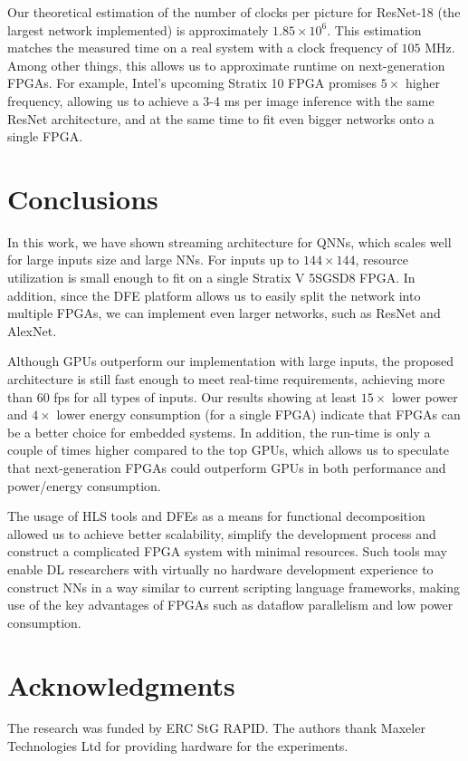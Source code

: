 \documentclass[conference]{IEEEtran}
\begin{document}
	Our theoretical estimation of the number of clocks per picture for ResNet-18 (the largest network implemented) is approximately $1.85 \times 10^6$. This estimation matches the measured time on a real system with a clock frequency of $105$ MHz. Among other things, this allows us to approximate runtime on next-generation FPGAs. For example, Intel's upcoming Stratix 10 FPGA promises $5\times$ higher frequency, allowing us to achieve a 3-4 ms per image inference with the same ResNet architecture, and at the same time to fit even bigger networks onto a single FPGA. 
	
	\section{Conclusions} \label{sec_conclusion}
	
	In this work, we have shown streaming architecture for QNNs, which scales well for large inputs size and large NNs. For inputs up to $144 \times 144$, resource utilization is small enough to fit on a single Stratix V 5SGSD8 FPGA. In addition, since the DFE platform allows us to easily split the network into multiple FPGAs, we can implement even larger networks, such as ResNet and AlexNet.
	
	Although GPUs outperform our implementation with large inputs, the proposed architecture is still fast enough to meet real-time requirements, achieving more than 60 fps for all types of inputs. Our results showing at least $15 \times$ lower power and $4\times$ lower energy consumption (for a single FPGA) indicate that FPGAs can be a better choice for embedded systems. In addition, the run-time is only a couple of times higher compared to the top GPUs, which allows us to speculate that next-generation FPGAs could outperform GPUs in both performance and power/energy consumption.
	
	The usage of HLS tools and DFEs as a means for functional decomposition allowed us to achieve better scalability, simplify the development process and construct a complicated FPGA system with minimal resources. Such tools may enable DL researchers with virtually no hardware development experience to construct NNs in a way similar to current scripting language frameworks, making use of the key advantages of FPGAs such as dataflow parallelism and low power consumption.
	
	\section*{Acknowledgments}
	
	The research was funded by ERC StG RAPID.
	The authors thank Maxeler Technologies Ltd for providing hardware for the experiments.
	
	
	
	
\end{document}
